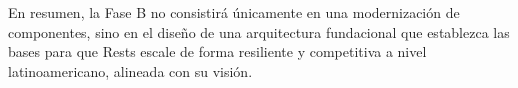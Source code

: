 \documentclass[12pt]{article}
\begin{document}
En resumen, la Fase B no consistir\'a \'unicamente en una modernizaci\'on de componentes, sino en el 
dise\~no de una arquitectura fundacional que establezca las bases para que Rests escale
de forma resiliente y competitiva a nivel latinoamericano, alineada con su visi\'on.

\newpage

\end{document}
